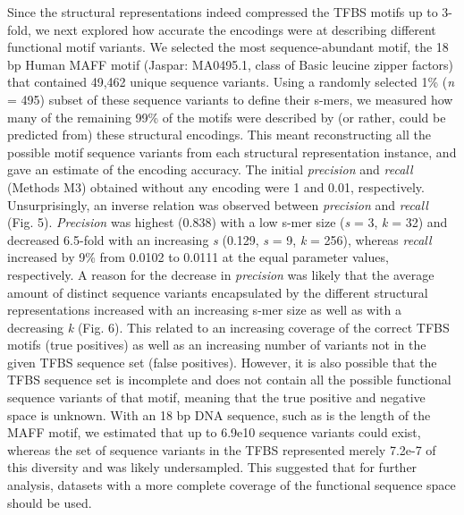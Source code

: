 \documentclass[10pt]{article}
\begin{document}
Since the structural representations indeed compressed the TFBS motifs up to 3-fold, we next explored how accurate the encodings were at describing different functional motif variants. We selected the most sequence-abundant motif, the 18 bp Human MAFF motif (Jaspar: MA0495.1, class of Basic leucine zipper factors) that contained 49,462 unique sequence variants. Using a randomly selected 1\% (\textit{n} = 495) subset of these sequence variants to define their s-mers, we measured how many of the remaining 99\% of the motifs were described by (or rather, could be predicted from) these structural encodings. This meant reconstructing all the possible motif sequence variants from each structural representation instance, and gave an estimate of the encoding accuracy. The initial \textit{precision} and \textit{recall} (Methods M3) obtained without any encoding were 1 and 0.01, respectively. Unsurprisingly, an inverse relation was observed between \textit{precision} and \textit{recall} (Fig. 5). \textit{Precision} was highest (0.838) with a low s-mer size (\textit{s} = 3, \textit{k} = 32) and decreased 6.5-fold with an increasing \textit{s} (0.129, \textit{s} = 9, \textit{k} = 256), whereas \textit{recall} increased by 9\% from 0.0102 to 0.0111 at the equal parameter values, respectively. A reason for the decrease in \textit{precision} was likely that the average amount of distinct sequence variants encapsulated by the different structural representations increased with an increasing s-mer size as well as with a decreasing \textit{k} (Fig. 6). This related to an increasing coverage of the correct TFBS motifs (true positives) as well as an increasing number of variants not in the given TFBS sequence set (false positives). However, it is also possible that the TFBS sequence set is incomplete and does not contain all the possible functional sequence variants of that motif, meaning that the true positive and negative space is unknown. With an 18 bp DNA sequence, such as is the length of the MAFF motif, we estimated that up to 6.9e10 sequence variants could exist, whereas the set of sequence variants in the TFBS represented merely 7.2e-7 of this diversity and was likely undersampled. This suggested that for further analysis, datasets with a more complete coverage of the functional sequence space should be used.
\end{document}
